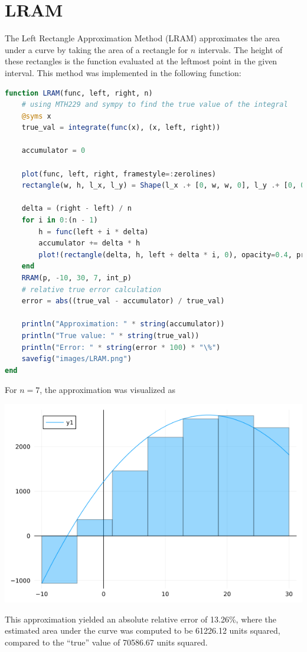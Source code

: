\documentclass[12pt]{article}
\begin{document}
\section{LRAM}
    The Left Rectangle Approximation Method (LRAM) approximates the area under a curve by taking the area of a rectangle for $n$ intervals. The height 
    of these rectangles is the function evaluated at the leftmost point in the given interval. This method was implemented in the following function:
    \begin{lstlisting}[language=julia]
function LRAM(func, left, right, n) 
    # using MTH229 and sympy to find the true value of the integral
    @syms x 
    true_val = integrate(func(x), (x, left, right))

    accumulator = 0 

    plot(func, left, right, framestyle=:zerolines)
    rectangle(w, h, l_x, l_y) = Shape(l_x .+ [0, w, w, 0], l_y .+ [0, 0, h, h])

    delta = (right - left) / n
    for i in 0:(n - 1)
        h = func(left + i * delta)
        accumulator += delta * h
        plot!(rectangle(delta, h, left + delta * i, 0), opacity=0.4, primary=false)
    end
    RRAM(p, -10, 30, 7, int_p)
    # relative true error calculation
    error = abs((true_val - accumulator) / true_val)

    println("Approximation: " * string(accumulator))
    println("True value: " * string(true_val))
    println("Error: " * string(error * 100) * "\%")
    savefig("images/LRAM.png")
end
    \end{lstlisting}
    For $ n= 7$, the approximation was visualized as 
    \begin{center}
        \includegraphics[scale=0.45]{images/LRAM_1.png}
    \end{center}
    This approximation yielded an absolute relative error of 13.26\%, where the estimated area under the curve 
    was computed to be 61226.12 units squared, compared to the ``true'' value of 70586.67 units squared. 
\end{document}
